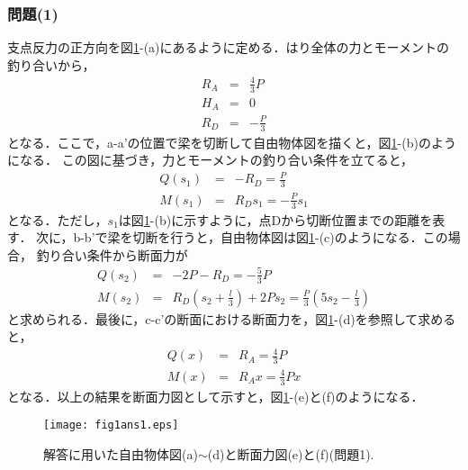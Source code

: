 \documentclass[10pt,a4j]{jarticle}
\begin{document}
\subsubsection*{問題(1)}
支点反力の正方向を図\ref{fig:fig1_1}-(a)にあるように定める．はり全体の力とモーメントの
釣り合いから，
\begin{eqnarray}
	R_A &=& \frac{4}{3}P \\
	H_A &=&0 \\
	R_D &=& -\frac{P}{3}
	\label{eqn:Rs_simple}
\end{eqnarray}
となる．ここで，a-a'の位置で梁を切断して自由物体図を描くと，図\ref{fig:fig1_1}-(b)のようになる．
この図に基づき，力とモーメントの釣り合い条件を立てると，
\begin{eqnarray}
	Q(s_1) &=& -R_D= \frac{P}{3} \\
	M(s_1) &=& R_D s_1=-\frac{P}{3}s_1
	\label{eqn:eqlbl}
\end{eqnarray}
となる．ただし，$s_1$は図\ref{fig:fig1_1}-(b)に示すように，点Dから切断位置までの距離を表す．
次に，b-b'で梁を切断を行うと，自由物体図は図\ref{fig:fig1_1}-(c)のようになる．この場合，
釣り合い条件から断面力が
\begin{eqnarray}
	Q(s_2) &=& -2P-R_D=-\frac{5}{3}P \\ 
	M(s_2) &=& R_D\left(s_2+\frac{l}{3}\right) +2Ps_2 = \frac{P}{3} \left( 5s_2-\frac{l}{3}\right)
	\label{eqn:eqlbl}
\end{eqnarray}
と求められる．最後に，c-c'の断面における断面力を，図\ref{fig:fig1_1}-(d)を参照して求めると，
\begin{eqnarray}
	Q(x) &=&R_A=\frac{4}{3}P \\ 
	M(x) &=&R_Ax = \frac{4}{3}Px 
	\label{eqn:eqlbl}
\end{eqnarray}
となる．以上の結果を断面力図として示すと，図\ref{fig:fig1_1}-(e)と(f)のようになる．
\begin{figure}[h]
	\begin{center}
	\texttt{[image: fig1ans1.eps]} 
	\end{center}
	\caption{解答に用いた自由物体図(a)$\sim$(d)と断面力図(e)と(f)(問題1).} 
	\label{fig:fig1_1}
\end{figure}
\end{document}
